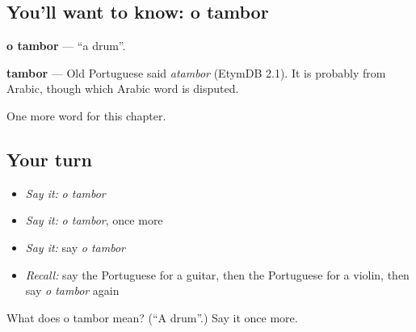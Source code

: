 \subsection*{You'll want to know: o tambor}
\textbf{o tambor} — \textquotedblleft{}a drum\textquotedblright{}.

\begin{cousinweb}
\textbf{tambor} — Old Portuguese said \emph{atambor} (EtymDB 2.1). It is probably from Arabic, though which Arabic word is disputed.
\end{cousinweb}

\begin{grammarlens}[title={What you've built}]
One more word for this chapter.
\end{grammarlens}

\subsection*{Your turn}
\begin{itemize}
\raggedright
  \item \emph{Say it:} \emph{o tambor}
  \item \emph{Say it:} \emph{o tambor}, once more
  \item \emph{Say it:} say \emph{o tambor}
  \item \emph{Recall:} say the Portuguese for a guitar, then the Portuguese for a violin, then say \emph{o tambor} again
\end{itemize}

\begin{tcolorbox}[breakable,colback=teal!4,colframe=teal!35!black,title={Before you move on}]
What does o tambor mean? (\textquotedblleft{}A drum\textquotedblright{}.) Say it once more.
\end{tcolorbox}

